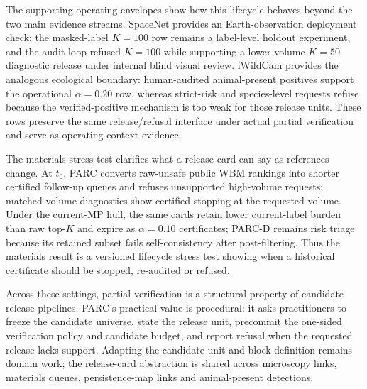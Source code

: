 \documentclass[10pt,twocolumn]{article}
\begin{document}
The supporting operating envelopes show how this lifecycle behaves beyond the two main evidence streams.
SpaceNet provides an Earth-observation deployment check: the masked-label \(K=100\) row remains a label-level holdout experiment, and the audit loop refused \(K=100\) while supporting a lower-volume \(K=50\) diagnostic release under internal blind visual review.
iWildCam provides the analogous ecological boundary: human-audited animal-present positives support the operational \(\alpha=0.20\) row, whereas strict-risk and species-level requests refuse because the verified-positive mechanism is too weak for those release units.
These rows preserve the same release/refusal interface under actual partial verification and serve as operating-context evidence.

The materials stress test clarifies what a release card can say as references change.
At \(t_0\), PARC converts raw-unsafe public WBM rankings into shorter certified follow-up queues and refuses unsupported high-volume requests; matched-volume diagnostics show certified stopping at the requested volume.
Under the current-MP hull, the same cards retain lower current-label burden than raw top-\(K\) and expire as \(\alpha=0.10\) certificates; PARC-D remains risk triage because its retained subset fails self-consistency after post-filtering.
Thus the materials result is a versioned lifecycle stress test showing when a historical certificate should be stopped, re-audited or refused.

Across these settings, partial verification is a structural property of candidate-release pipelines.
PARC's practical value is procedural: it asks practitioners to freeze the candidate universe, state the release unit, precommit the one-sided verification policy and candidate budget, and report refusal when the requested release lacks support.
Adapting the candidate unit and block definition remains domain work; the release-card abstraction is shared across microscopy links, materials queues, persistence-map links and animal-present detections.
\end{document}
